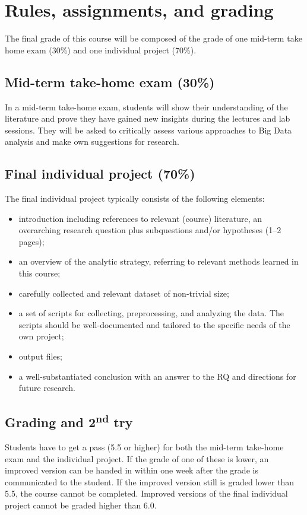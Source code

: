 \documentclass[a4paper,10pt]{report}
\begin{document}
\chapter{Rules, assignments, and grading}
The final grade of this course will be composed of the grade of one mid-term take home exam (30\%) and one individual project (70\%).

\section{Mid-term take-home exam (30\%)}
In a mid-term take-home exam, students will show their understanding of the literature and prove they have gained new insights during the lectures and lab sessions. They will be asked to critically assess various approaches to Big Data analysis and make own suggestions for research.

\section{Final individual project (70\%)}
The final individual project typically consists of the following elements:
\begin{itemize}
\item introduction including references to relevant (course) literature, an overarching research question plus subquestions and/or hypotheses (1–2 pages);
\item an overview of the analytic strategy, referring to relevant methods learned in this course;
\item carefully collected and relevant dataset of non-trivial size;
\item a set of scripts for collecting, preprocessing, and analyzing the data. The scripts should be well-documented and tailored to the specific needs of the own project;
\item output files;
\item a well-substantiated conclusion with an answer to the RQ and directions for future research.
\end{itemize}

\section{Grading and 2\textsuperscript{nd} try}
Students have to get a pass (5.5 or higher) for both the mid-term take-home exam and the individual project. If the grade of one of these is lower, an improved version can be handed in within one week after the grade is communicated to the student. If the improved version still is graded lower than 5.5, the course cannot be completed. Improved versions of the final individual project cannot be graded higher than 6.0. 
\end{document}
